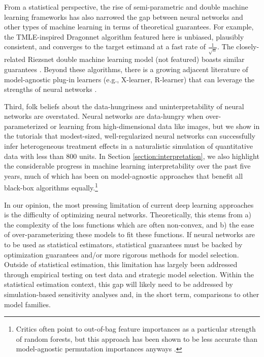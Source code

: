 From a statistical perspective, the rise of semi-parametric and double machine learning frameworks has also narrowed the gap between neural networks and other types of machine learning in terms of theoretical guarantees. For example, the TMLE-inspired Dragonnet algorithm featured here is unbiased, plausibly consistent, and converges to the target estimand at a fast rate of $\frac{1}{\sqrt{n}}$. The closely-related Riezsnet double machine learning model (not featured) boasts similar guarantees \citep{chernozhukov2022riesznet}. Beyond these algorithms, there is a growing adjacent literature of model-agnostic plug-in learners (e.g., X-learner, R-learner) that can leverage the strengths of neural networks \citep{nie2021quasi,kunzel2019metalearners}.

Third, folk beliefs about the data-hungriness and uninterpretability of neural networks are overstated. Neural networks are data-hungry when over-parameterized or learning from high-dimensional data like images, but we show in the tutorials that modest-sized, well-regularized neural networks can successfully infer heterogeneous treatment effects in a naturalistic simulation of quantitative data with less than 800 units. In Section \ref{section:interpretation}, we also highlight the considerable progress in machine learning interpretability over the past five years, much of which has been on model-agnostic approaches that benefit all black-box algorithms equally.\footnote{Critics often point to out-of-bag feature importances as a particular strength of random forests, but this approach has been shown to be less accurate than model-agnostic permutation importances anyways \citep{altmann2010}.}

In our opinion, the most pressing limitation of current deep learning approaches is the difficulty of optimizing neural networks. Theoretically, this stems from a) the complexity of the loss functions which are often non-convex, and b) the ease of over-parameterizing these models to fit these functions. If neural networks are to be used as statistical estimators, statistical guarantees must be backed by optimization guarantees and/or more rigorous methods for model selection. Outside of statistical estimation, this limitation has largely been addressed through empirical testing on test data and strategic model selection. Within the statistical estimation context, this gap will likely need to be addressed by simulation-based sensitivity analyses and, in the short term, comparisons to other model families.

